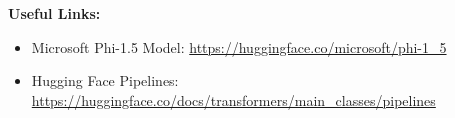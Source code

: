 \documentclass[11pt, oneside]{article}   	%
\begin{document}
\textbf{Useful Links:}
\begin{itemize}
    \item Microsoft Phi-1.5 Model: \href{https://huggingface.co/microsoft/phi-1_5}{https://huggingface.co/microsoft/phi-1\_5}
    \item Hugging Face Pipelines: \href{https://huggingface.co/docs/transformers/main_classes/pipelines}{https://huggingface.co/docs/transformers/main\_classes/pipelines}
\end{itemize}
\end{document}
